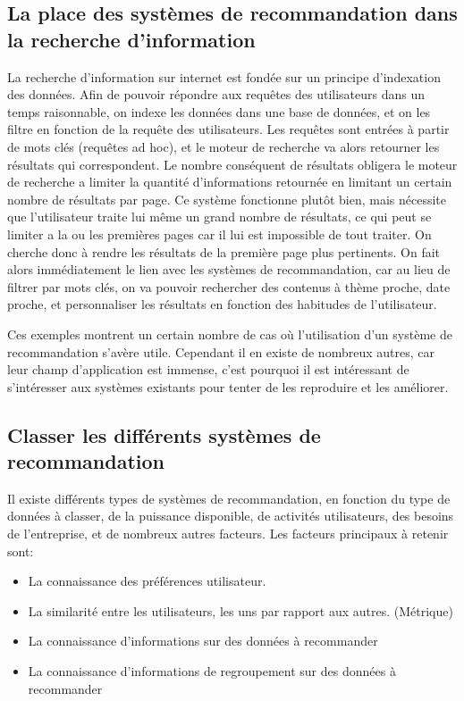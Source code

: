 \documentclass{report}
\begin{document}
\newpage
\subsection{La place des systèmes de recommandation dans la recherche d'information}

La recherche d'information sur internet est fondée sur un principe d'indexation des données. Afin de pouvoir répondre aux requêtes des utilisateurs dans un temps raisonnable, on indexe les données dans une base de données, et on les filtre en fonction de la requête des utilisateurs. Les requêtes sont entrées à partir de mots clés (requêtes ad hoc), et le moteur de recherche va alors retourner les résultats qui correspondent.
Le nombre conséquent de résultats obligera le moteur de recherche a limiter la quantité d'informations retournée en limitant un certain nombre de résultats par page.
Ce système fonctionne plutôt bien, mais nécessite que l'utilisateur traite lui même un grand nombre de résultats, ce qui peut se limiter a la ou les premières pages car il lui est impossible de tout traiter.
On cherche donc à rendre les résultats de la première page plus pertinents. On fait alors immédiatement le lien avec les systèmes de recommandation, car au lieu de filtrer par mots clés, on va pouvoir rechercher des contenus à thème proche, date proche, et personnaliser les résultats en fonction des habitudes de l'utilisateur.\par

Ces exemples montrent un certain nombre de cas où l'utilisation d'un système de recommandation s'avère utile. Cependant il en existe de nombreux autres, car leur champ d'application est immense, c'est pourquoi il est intéressant de s'intéresser aux systèmes existants pour tenter de les reproduire et les améliorer.


\newpage
\subsection{Classer les différents systèmes de recommandation}
Il existe différents types de systèmes de recommandation, en fonction du type de données à classer, de la puissance disponible, de activités utilisateurs, des besoins de l'entreprise, et de nombreux autres facteurs.
Les facteurs principaux à retenir sont:
\begin{itemize}
	\item La connaissance des préférences utilisateur.
	\item La similarité entre les utilisateurs, les uns par rapport aux autres. (Métrique)
	\item La connaissance d'informations sur des données à recommander
	\item La connaissance d'informations de regroupement sur des données à recommander
\end{itemize}
\end{document}
